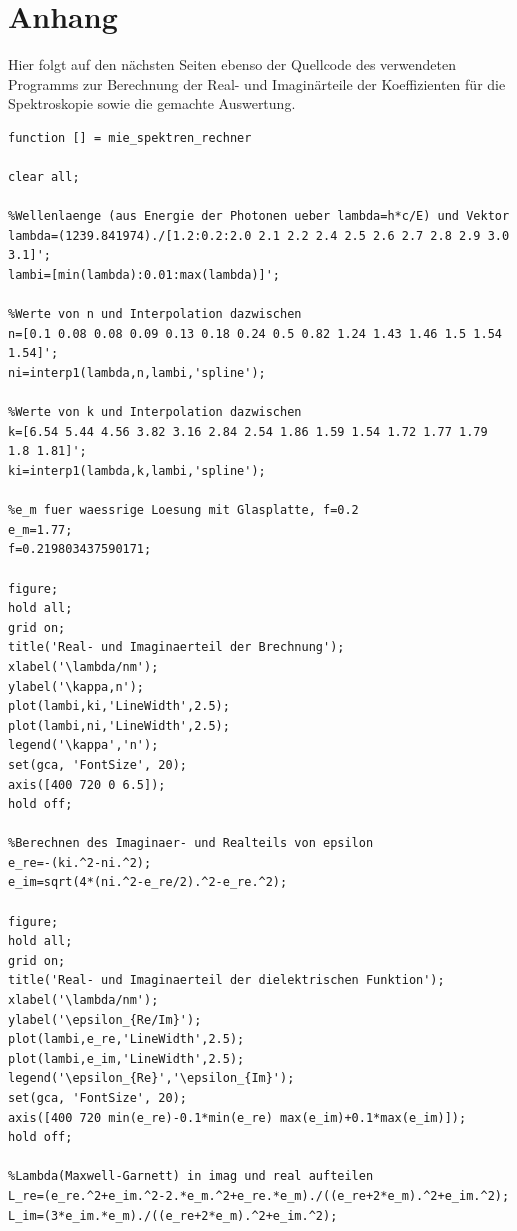 \documentclass[numbers=noenddot,a4paper,notitlepage,twoside,BCOR15mm]{scrartcl}
\begin{document}
	\newpage
	\section{Anhang}\label{sec:anhang}

		Hier folgt auf den nächsten Seiten ebenso der Quellcode des verwendeten Programms zur Berechnung der Real- und Imaginärteile der Koeffizienten für die Spektroskopie sowie die gemachte Auswertung.

		
		

	\newpage


	\lstset{
		flexiblecolumns=true,
		numbers=left
	}

\begin{lstlisting}
function [] = mie_spektren_rechner

clear all;

%Wellenlaenge (aus Energie der Photonen ueber lambda=h*c/E) und Vektor
lambda=(1239.841974)./[1.2:0.2:2.0 2.1 2.2 2.4 2.5 2.6 2.7 2.8 2.9 3.0 3.1]';
lambi=[min(lambda):0.01:max(lambda)]';

%Werte von n und Interpolation dazwischen
n=[0.1 0.08 0.08 0.09 0.13 0.18 0.24 0.5 0.82 1.24 1.43 1.46 1.5 1.54 1.54]';
ni=interp1(lambda,n,lambi,'spline');

%Werte von k und Interpolation dazwischen
k=[6.54 5.44 4.56 3.82 3.16 2.84 2.54 1.86 1.59 1.54 1.72 1.77 1.79 1.8 1.81]';
ki=interp1(lambda,k,lambi,'spline');

%e_m fuer waessrige Loesung mit Glasplatte, f=0.2
e_m=1.77;
f=0.219803437590171;

figure;
hold all;
grid on;
title('Real- und Imaginaerteil der Brechnung');
xlabel('\lambda/nm');
ylabel('\kappa,n');
plot(lambi,ki,'LineWidth',2.5);
plot(lambi,ni,'LineWidth',2.5);
legend('\kappa','n');
set(gca, 'FontSize', 20);
axis([400 720 0 6.5]);
hold off;

%Berechnen des Imaginaer- und Realteils von epsilon
e_re=-(ki.^2-ni.^2);
e_im=sqrt(4*(ni.^2-e_re/2).^2-e_re.^2);

figure;
hold all;
grid on;
title('Real- und Imaginaerteil der dielektrischen Funktion');
xlabel('\lambda/nm');
ylabel('\epsilon_{Re/Im}');
plot(lambi,e_re,'LineWidth',2.5);
plot(lambi,e_im,'LineWidth',2.5);
legend('\epsilon_{Re}','\epsilon_{Im}');
set(gca, 'FontSize', 20);
axis([400 720 min(e_re)-0.1*min(e_re) max(e_im)+0.1*max(e_im)]);
hold off;

%Lambda(Maxwell-Garnett) in imag und real aufteilen
L_re=(e_re.^2+e_im.^2-2.*e_m.^2+e_re.*e_m)./((e_re+2*e_m).^2+e_im.^2);
L_im=(3*e_im.*e_m)./((e_re+2*e_m).^2+e_im.^2);


\end{lstlisting}
\end{document}
